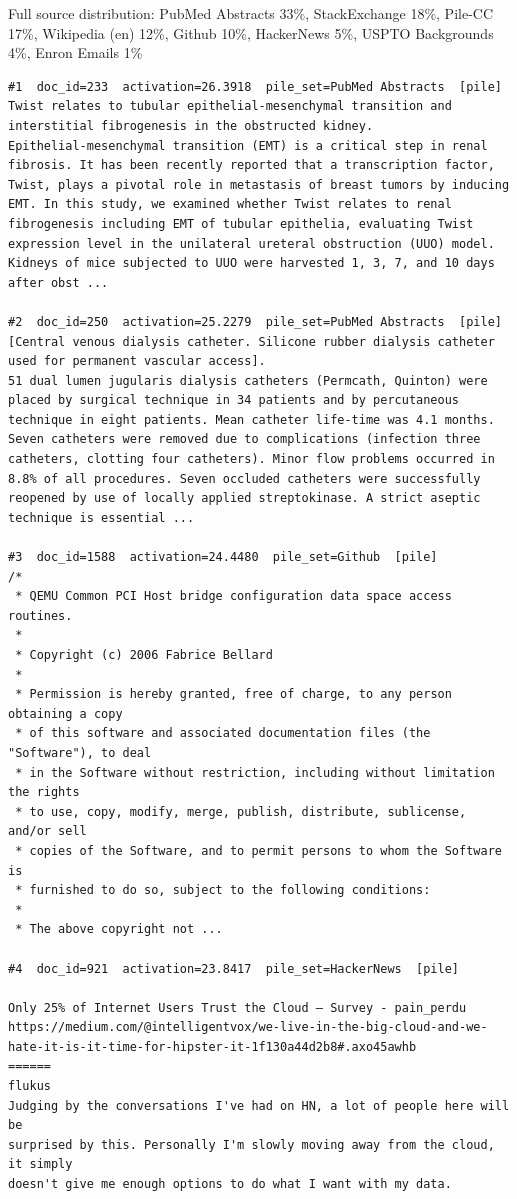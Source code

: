 Full source distribution: PubMed Abstracts 33\%, StackExchange 18\%, Pile-CC 17\%, Wikipedia (en) 12\%, Github 10\%, HackerNews 5\%, USPTO Backgrounds 4\%, Enron Emails 1\%

\begin{verbatim}
#1  doc_id=233  activation=26.3918  pile_set=PubMed Abstracts  [pile]
Twist relates to tubular epithelial-mesenchymal transition and interstitial fibrogenesis in the obstructed kidney.
Epithelial-mesenchymal transition (EMT) is a critical step in renal fibrosis. It has been recently reported that a transcription factor, Twist, plays a pivotal role in metastasis of breast tumors by inducing EMT. In this study, we examined whether Twist relates to renal fibrogenesis including EMT of tubular epithelia, evaluating Twist expression level in the unilateral ureteral obstruction (UUO) model. Kidneys of mice subjected to UUO were harvested 1, 3, 7, and 10 days after obst ...

#2  doc_id=250  activation=25.2279  pile_set=PubMed Abstracts  [pile]
[Central venous dialysis catheter. Silicone rubber dialysis catheter used for permanent vascular access].
51 dual lumen jugularis dialysis catheters (Permcath, Quinton) were placed by surgical technique in 34 patients and by percutaneous technique in eight patients. Mean catheter life-time was 4.1 months. Seven catheters were removed due to complications (infection three catheters, clotting four catheters). Minor flow problems occurred in 8.8% of all procedures. Seven occluded catheters were successfully reopened by use of locally applied streptokinase. A strict aseptic technique is essential ...

#3  doc_id=1588  activation=24.4480  pile_set=Github  [pile]
/*
 * QEMU Common PCI Host bridge configuration data space access routines.
 *
 * Copyright (c) 2006 Fabrice Bellard
 *
 * Permission is hereby granted, free of charge, to any person obtaining a copy
 * of this software and associated documentation files (the "Software"), to deal
 * in the Software without restriction, including without limitation the rights
 * to use, copy, modify, merge, publish, distribute, sublicense, and/or sell
 * copies of the Software, and to permit persons to whom the Software is
 * furnished to do so, subject to the following conditions:
 *
 * The above copyright not ...

#4  doc_id=921  activation=23.8417  pile_set=HackerNews  [pile]

Only 25% of Internet Users Trust the Cloud – Survey - pain_perdu
https://medium.com/@intelligentvox/we-live-in-the-big-cloud-and-we-hate-it-is-it-time-for-hipster-it-1f130a44d2b8#.axo45awhb
======
flukus
Judging by the conversations I've had on HN, a lot of people here will be
surprised by this. Personally I'm slowly moving away from the cloud, it simply
doesn't give me enough options to do what I want with my data.


\end{verbatim}
